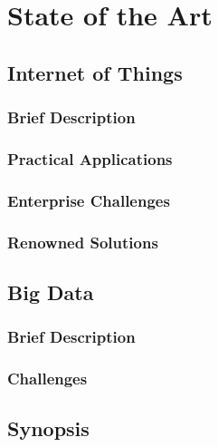 \chapter{State of the Art}
\label{chap:state_of_art}

\section{Internet of Things}
\label{sec:state_of_art:iot}

\subsection{Brief Description}
\label{subsec:state_of_art:iot:brief_description}

\subsection{Practical Applications}
\label{subsec:state_of_art:iot:pratical_applications}

\subsection{Enterprise Challenges}
\label{subsec:state_of_art:iot:enterprise_challenges}

\subsection{Renowned Solutions}
\label{subsec:state_of_art:iot:renowned_solutions}

\section{Big Data}
\label{sec:state_of_art:big_data}

\subsection{Brief Description}
\label{subsec:state_of_art:big_data:brief_description}

\subsection{Challenges}
\label{subsec:state_of_art:big_data:challenges}

\section{Synopsis}
\label{sec:state_of_art:synopsis}
